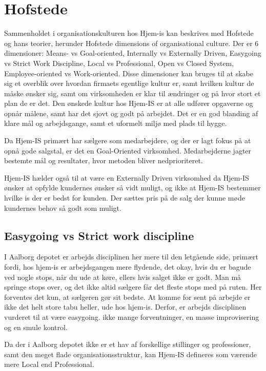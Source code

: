 \section{Hofstede}
Sammenholdet i organisationskulturen hos Hjem-is kan beskrives med Hofstede og hans teorier, herunder Hofstede dimensions of organisational culture. Der er 6 dimensioner: Means- vs Goal-oriented, Internally vs Externally Driven, Easygoing vs Strict Work Discipline, Local vs Professional, Open vs Closed System, Employee-oriented vs Work-oriented.   Disse dimensioner kan bruges til at skabe sig et overblik over hvordan firmaets egentlige kultur er, samt hvilken kultur de måske ønsker sig, samt om virksomheden er klar til ændringer og på hvor stort et plan de er det. Den ønskede kultur hos Hjem-IS er at alle udfører opgaverne og opnår målene, samt har det sjovt og godt på arbejdet. Det er en god blanding af klare mål og arbejdsgange, samt et uformelt miljø med plads til hygge.

Da Hjem-IS primært har sælgere som medarbejdere, og der er lagt fokus på at opnå gode salgstal, er det en Goal-Oriented virksomhed. Medarbejderne jagter bestemte mål og resultater, hvor metoden bliver nedprioriteret.

Hjem-IS hælder også til at være en Externally Driven virksomhed da Hjem-IS ønsker at opfylde kundernes ønsker så vidt muligt, og ikke at Hjem-IS bestemmer hvilke is der er bedst for kunden. Der sættes pris på de salg der kunne møde kundernes behov så godt som muligt.

\subsection{Easygoing vs Strict work discipline}
I Aalborg depotet er arbejds disciplinen her mere til den letgående side, primært fordi, hos hjem-is er arbejdsgangen mere flydende, det okay, hvis du er bagude ved nogle stops, når du ude at køre, ellers hvis salget ikke er godt. Man må springe stops over, og det ikke altid sælgere får det fleste stops med på ruten. Her forventes det kun, at sælgeren gør sit bedste. At komme for sent på arbejde er ikke det helt store tabu heller, ude hos hjem-is. Derfor, er arbejds disciplinen vurderet til at være easygoing. ikke mange forventninger, en masse improvisering og en smule kontrol.

Da der i Aalborg depotet ikke er et hav af forskellige stillinger og professioner, samt den meget flade organisationsstruktur, kan Hjem-IS defineres som værende mere Local end Professional.

